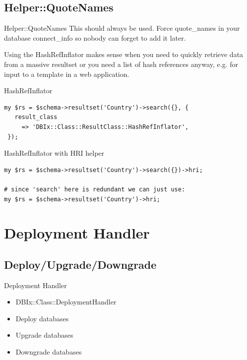 \subsection{Helper::QuoteNames}

\begin{frame}{Helper::QuoteNames}
This should always be used. Force quote\_names in your database
connect\_info so nobody can forget to add it later.
\end{frame}

Using the HashRefInflator makes sense when you need to quickly retrieve
data from a massive resultset or you need a list of hash references anyway,
e.g. for input to a template in a web application.

\begin{frame}[fragile]{HashRefInflator}
\begin{lstlisting}
my $rs = $schema->resultset('Country')->search({}, {
   result_class
     => 'DBIx::Class::ResultClass::HashRefInflator',
 });
\end{lstlisting}
\end{frame}

\begin{frame}[fragile]{HashRefInflator with HRI helper}
\begin{lstlisting}
my $rs = $schema->resultset('Country')->search({})->hri;

# since 'search' here is redundant we can just use:
my $rs = $schema->resultset('Country')->hri;
\end{lstlisting}
\end{frame}


\section{Deployment Handler}

\subsection{Deploy/Upgrade/Downgrade}

\begin{frame}{Deployment Handler}
\begin{itemize}
\item DBIx::Class::DeploymentHandler
\item Deploy databases
\item Upgrade databases
\item Downgrade databases
\end{itemize}
\end{frame}

